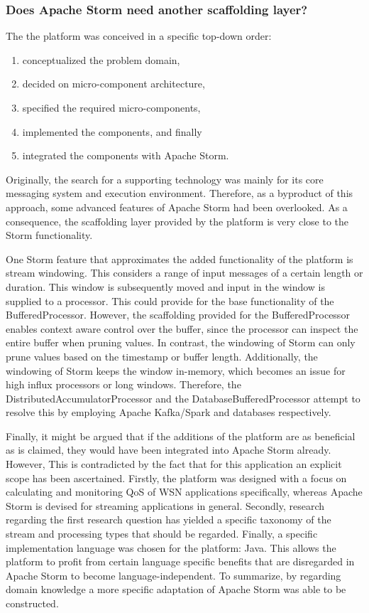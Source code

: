 \subsubsection{Does Apache Storm need another scaffolding layer?}
The the platform was conceived in a specific top-down order:
\begin{enumerate}
\nospace
\item conceptualized the problem domain,
\item decided on micro-component architecture,
\item specified the required micro-components,
\item implemented the components, and finally
\item integrated the components with Apache Storm. 
\end{enumerate}
Originally, the search  for a supporting technology was mainly for its core messaging system and execution environment. Therefore, as a byproduct of this approach, some advanced features of Apache Storm had been overlooked. As a consequence, the scaffolding layer provided by the platform is very close to the Storm functionality.

One Storm feature that approximates the added functionality of the platform is stream windowing. This considers a range of input messages of a certain length or duration. This window is subsequently moved and input in the window is supplied to a processor. This could provide for the base functionality of the BufferedProcessor. However, the scaffolding provided for the BufferedProcessor enables context aware control over the buffer, since the processor can inspect the entire buffer when pruning values. In contrast, the windowing of Storm  can only prune values based on the timestamp or buffer length. Additionally, the windowing of Storm keeps the window in-memory, which becomes an issue for high influx processors or long windows. Therefore, the DistributedAccumulatorProcessor and the DatabaseBufferedProcessor attempt to resolve this by employing Apache Kafka/Spark and databases respectively.

Finally, it might be argued that if the additions of the platform are as beneficial as is claimed, they would have been integrated into Apache Storm already. However, This is contradicted by the fact that for this application an explicit scope has been ascertained. Firstly, the platform was designed with a focus on calculating and monitoring QoS of WSN applications specifically, whereas Apache Storm is devised for streaming applications in general. Secondly, research regarding the first research question has yielded a specific taxonomy of the stream and processing types that should be regarded. Finally, a specific implementation language was chosen for the platform: Java. This allows the platform to profit from certain language specific benefits that are disregarded in Apache Storm to become language-independent. To summarize, by regarding domain knowledge a more specific adaptation of Apache Storm was able to be constructed.
		
